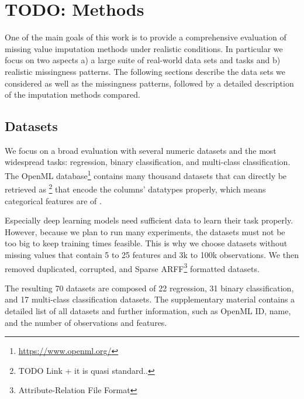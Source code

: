 
\section{TODO: Methods}
%
One of the main goals of this work is to provide a comprehensive evaluation of missing value imputation methods under realistic conditions. In particular we focus on two aspects a) a large suite of real-world data sets and tasks and b) realistic missingness patterns. The following sections describe the data sets we considered as well as the missingness patterns, followed by a detailed description of the imputation methods compared. 

\subsection{Datasets}
%
We focus on a broad evaluation with several numeric datasets and the most widespread tasks: regression, binary classification, and multi-class classification. The OpenML database\footnote{\url{https://www.openml.org/}} contains many thousand datasets that can directly be retrieved as \footnote{TODO Link + it is quasi standard..} that encode the columns' datatypes properly, which means categorical features are of  .

Especially deep learning models need sufficient data to learn their task properly. However, because we plan to run many experiments, the datasets must not be too big to keep training times feasible. This is why we choose datasets without missing values that contain 5 to 25 features and 3k to 100k observations. We then removed duplicated, corrupted, and Sparse ARFF\footnote{Attribute-Relation File Format} formatted datasets.

The resulting 70 datasets are composed of 22 regression, 31 binary classification, and 17 multi-class classification datasets. The supplementary material contains a detailed list of all datasets and further information, such as OpenML ID, name, and the number of observations and features.


